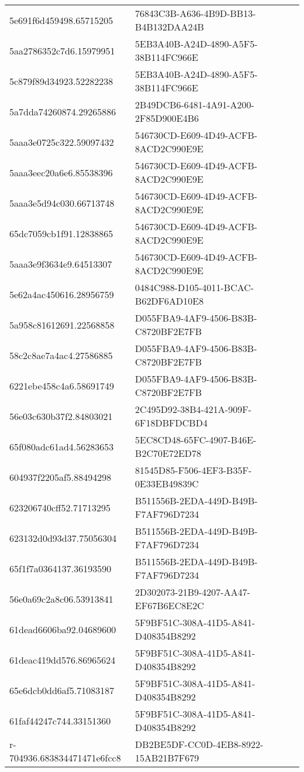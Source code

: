 \begin{tabular}{ll}
5e691f6d459498.65715205 & 76843C3B-A636-4B9D-BB13-B4B132DAA24B \\
5aa2786352c7d6.15979951 & 5EB3A40B-A24D-4890-A5F5-38B114FC966E \\
5c879f89d34923.52282238 & 5EB3A40B-A24D-4890-A5F5-38B114FC966E \\
5a7dda74260874.29265886 & 2B49DCB6-6481-4A91-A200-2F85D900E4B6 \\
5aaa3e0725c322.59097432 & 546730CD-E609-4D49-ACFB-8ACD2C990E9E \\
5aaa3eec20a6e6.85538396 & 546730CD-E609-4D49-ACFB-8ACD2C990E9E \\
5aaa3e5d94c030.66713748 & 546730CD-E609-4D49-ACFB-8ACD2C990E9E \\
65dc7059cb1f91.12838865 & 546730CD-E609-4D49-ACFB-8ACD2C990E9E \\
5aaa3e9f3634e9.64513307 & 546730CD-E609-4D49-ACFB-8ACD2C990E9E \\
5e62a4ac450616.28956759 & 0484C988-D105-4011-BCAC-B62DF6AD10E8 \\
5a958c81612691.22568858 & D055FBA9-4AF9-4506-B83B-C8720BF2E7FB \\
58c2c8ae7a4ac4.27586885 & D055FBA9-4AF9-4506-B83B-C8720BF2E7FB \\
6221ebe458c4a6.58691749 & D055FBA9-4AF9-4506-B83B-C8720BF2E7FB \\
56e03c630b37f2.84803021 & 2C495D92-38B4-421A-909F-6F18DBFDCBD4 \\
65f080adc61ad4.56283653 & 5EC8CD48-65FC-4907-B46E-B2C70E72ED78 \\
604937f2205af5.88494298 & 81545D85-F506-4EF3-B35F-0E33EB49839C \\
623206740cff52.71713295 & B511556B-2EDA-449D-B49B-F7AF796D7234 \\
623132d0d93d37.75056304 & B511556B-2EDA-449D-B49B-F7AF796D7234 \\
65f1f7a0364137.36193590 & B511556B-2EDA-449D-B49B-F7AF796D7234 \\
56e0a69c2a8c06.53913841 & 2D302073-21B9-4207-AA47-EF67B6EC8E2C \\
61dead6606ba92.04689600 & 5F9BF51C-308A-41D5-A841-D408354B8292 \\
61deac419dd576.86965624 & 5F9BF51C-308A-41D5-A841-D408354B8292 \\
65e6dcb0dd6af5.71083187 & 5F9BF51C-308A-41D5-A841-D408354B8292 \\
61faf44247c744.33151360 & 5F9BF51C-308A-41D5-A841-D408354B8292 \\
r-704936.683834471471e6fcc8 & DB2BE5DF-CC0D-4EB8-8922-15AB21B7F679 \\

\end{tabular}
